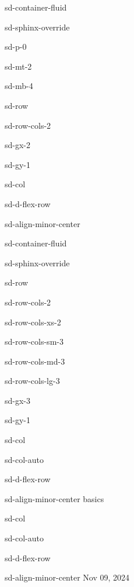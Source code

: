 \documentclass[letterpaper,10pt,english]{jupyterBook}
\begin{document}
\sphinxstepscope

\begin{sphinxuseclass}{sd-container-fluid}
\begin{sphinxuseclass}{sd-sphinx-override}
\begin{sphinxuseclass}{sd-p-0}
\begin{sphinxuseclass}{sd-mt-2}
\begin{sphinxuseclass}{sd-mb-4}
\begin{sphinxuseclass}{sd-row}
\begin{sphinxuseclass}{sd-row-cols-2}
\begin{sphinxuseclass}{sd-gx-2}
\begin{sphinxuseclass}{sd-gy-1}
\begin{sphinxuseclass}{sd-col}
\begin{sphinxuseclass}{sd-d-flex-row}
\begin{sphinxuseclass}{sd-align-minor-center}
\begin{sphinxuseclass}{sd-container-fluid}
\begin{sphinxuseclass}{sd-sphinx-override}
\begin{sphinxuseclass}{sd-row}
\begin{sphinxuseclass}{sd-row-cols-2}
\begin{sphinxuseclass}{sd-row-cols-xs-2}
\begin{sphinxuseclass}{sd-row-cols-sm-3}
\begin{sphinxuseclass}{sd-row-cols-md-3}
\begin{sphinxuseclass}{sd-row-cols-lg-3}
\begin{sphinxuseclass}{sd-gx-3}
\begin{sphinxuseclass}{sd-gy-1}
\begin{sphinxuseclass}{sd-col}
\begin{sphinxuseclass}{sd-col-auto}
\begin{sphinxuseclass}{sd-d-flex-row}
\begin{sphinxuseclass}{sd-align-minor-center}
\sphinxAtStartPar
basics

\end{sphinxuseclass}
\end{sphinxuseclass}
\end{sphinxuseclass}
\end{sphinxuseclass}
\begin{sphinxuseclass}{sd-col}
\begin{sphinxuseclass}{sd-col-auto}
\begin{sphinxuseclass}{sd-d-flex-row}
\begin{sphinxuseclass}{sd-align-minor-center}
\sphinxAtStartPar
Nov 09, 2024


\end{sphinxuseclass}
\end{sphinxuseclass}
\end{sphinxuseclass}
\end{sphinxuseclass}
\end{sphinxuseclass}
\end{sphinxuseclass}
\end{sphinxuseclass}
\end{sphinxuseclass}
\end{sphinxuseclass}
\end{sphinxuseclass}
\end{sphinxuseclass}
\end{sphinxuseclass}
\end{sphinxuseclass}
\end{sphinxuseclass}
\end{sphinxuseclass}
\end{sphinxuseclass}
\end{sphinxuseclass}
\end{sphinxuseclass}
\end{sphinxuseclass}
\end{sphinxuseclass}
\end{sphinxuseclass}
\end{sphinxuseclass}
\end{sphinxuseclass}
\end{sphinxuseclass}
\end{sphinxuseclass}
\end{sphinxuseclass}
\end{document}
